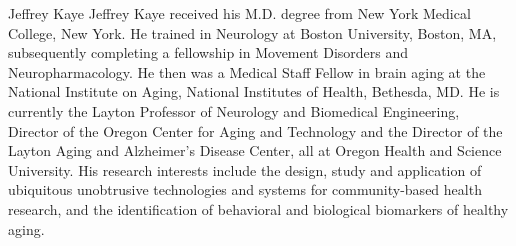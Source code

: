 \documentclass[journal]{IEEEtran}
\begin{document}
\vspace{-1 cm}
\begin{IEEEbiography}
{Jeffrey Kaye}
Jeffrey Kaye received his M.D. degree from New York Medical College, New York.
He trained in Neurology at Boston University, Boston, MA, subsequently completing a fellowship in Movement Disorders and Neuropharmacology. He then was a Medical Staff Fellow in brain aging at the National Institute on Aging, National Institutes of Health, Bethesda, MD. He is currently the Layton Professor of Neurology and Biomedical Engineering, Director of the Oregon Center for Aging and Technology and the Director of the Layton Aging and Alzheimer’s Disease Center, all at Oregon Health and Science University. His research interests include the design, study and application of ubiquitous unobtrusive technologies and systems for community-based health research, and the identification of behavioral and biological biomarkers of healthy aging. 
\end{IEEEbiography}
\end{document}
